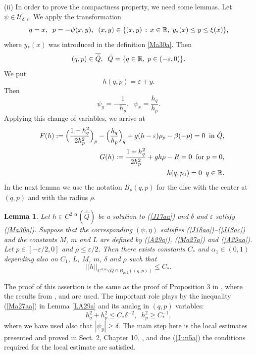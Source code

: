 \documentclass[a4paper,reqno,12pt]{amsart}
\theoremstyle{plain}
\newtheorem{lemma}[theorem]{Lemma}
\theoremstyle{definition}
\numberwithin{equation}{section}
\begin{document}
\medskip
(ii) In order to prove the compactness property, we need some lemmas. Let $\psi\in\overline{{\mathcal U}_{\delta,\varepsilon}}$. We apply the transformation
$$
q=x,\;\;p=-\psi(x,y),\;\;(x,y)\in \{(x,y)\,:\,x\in\Bbb R,\;y_*(x)\leq y\leq \xi(x)\},
$$
where $y_*(x)$ was introduced in the definition \ref{Ma30a}.
Then
$$
(q,p)\in\overline{\hat{Q}},\;\;\hat{Q}=\{q\in\Bbb R,\;p\in (-\varepsilon,0)\}.
$$
We put
$$
h(q,p)=\varepsilon+y.
$$
Then
$$
\psi_y=-\frac{1}{h_p},\;\;\psi_x=\frac{h_q}{h_p}.
$$
Applying this change of variables, we arrive at
\begin{eqnarray}\label{J17aa}
&&F(h):=\Big(\frac{1+h_q^2}{2h_p^2}\Big)_p-\Big(\frac{h_q}{h_p}\Big)_q
+g(h-\varepsilon)\rho_p
-\beta(-p)=0\;\;
\mbox{in $\hat{Q}$},\nonumber\\
&&G(h):=\frac{1+h_q^2}{2h_p^2}+gh\rho-R=0\;\;\mbox{for $p=0$},\nonumber\\
&&h(q,p_0)=0\;\;q\in\Bbb R.
\end{eqnarray}
In the next lemma we use the notation $B_\rho(q,p)$ for the disc with the center at $(q,p)$ and with the radius $\rho$.

\begin{lemma}\label{LMa31a} Let $h\in C^{2,\alpha}(\overline{\hat{Q}})$  be a solution to (\ref{J17aa}) and $\delta$ and $\varepsilon$ satisfy (\ref{Ma30a}).
Suppose that the corresponding $(\psi,\eta)$ satisfies (\ref{J18aa})--(\ref{J18ac}) and the constants $M$, $m$ and $L$ are defined by (\ref{A29a}), (\ref{Ma27a}) and (\ref{A29aa}). Let $p\in [-\varepsilon/2,0]$ and $\rho\leq\varepsilon/2$.
Then there exists constants $C_*$ and $\alpha_1\in (0,1)$  depending also on $C_1$, $L$, $M$, $m$, $\delta$ and $\rho$ such that
$$
||h||_{C^{3,\alpha_1}(\hat{Q}\cap B_{\rho/2}((q,p))}\leq C_*.
$$
\end{lemma}
The proof of this assertion is the same as the proof of Proposition 3 in \cite{KLN17}, where the results from \cite{GT}, \cite{LU} and \cite{ADN} are used. The important role plays by the inequality (\ref{Ma27aa}) in Lemma \ref{LA29a}  and its analog in $(q,p)$ variables:
\begin{equation}\label{Jun5a}
h_q^2+h_p^2\leq C_*\delta^{-2},\;\;h_p^2\geq C_*^{-1},
\end{equation}
where we have used also that $|\psi_y|\geq\delta$.  The main step here  is the local estimates  presented and proved in Sect. 2, Chapter 10, \cite{LU}, and due (\ref{Jun5a}) the conditions required for the local estimate are satisfied.
\end{document}
